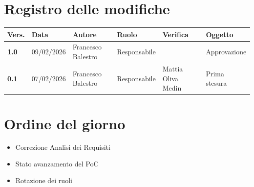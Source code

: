 \documentclass[a4paper,12pt]{article}
\begin{document}
    

    \newpage
    \section*{Registro delle modifiche}

    \begin{table}[h!]
        \begin{tabularx}{\textwidth}{|l|l|l|l|X|X|}
            \hline
            \textbf{Vers.} & \textbf{Data} & \textbf{Autore} & \textbf{Ruolo} & \textbf{Verifica} & \textbf{Oggetto} \\
            \hline
            \textbf{1.0} & 09/02/2026 & Francesco Balestro & Responsabile &  & Approvazione \\
            \hline
            \textbf{0.1} & 07/02/2026 & Francesco Balestro & Responsabile & Mattia Oliva Medin & Prima stesura \\
        \hline
        \end{tabularx}
    \end{table}

    \newpage
    \tableofcontents
    \newpage

    \section{Ordine del giorno} {
        \begin{itemize}
            \item Correzione Analisi dei Requisiti
            \item Stato avanzamento del PoC
            \item Rotazione dei ruoli
        \end{itemize}
    }
\end{document}
